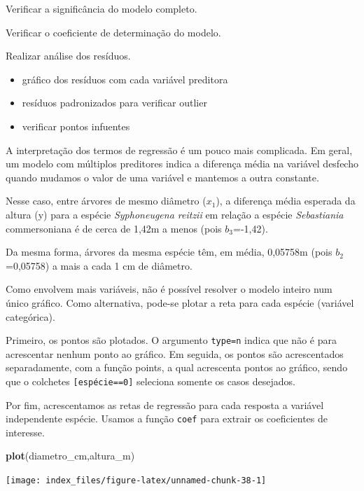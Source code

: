 \documentclass[12pt,brazil,oneside]{book}
\newenvironment{Shaded}{\begin{snugshade}}{\end{snugshade}}
\newcommand{\KeywordTok}[1]{\textcolor[rgb]{0.13,0.29,0.53}{\textbf{#1}}}
\newcommand{\NormalTok}[1]{#1}
\providecommand{\tightlist}{%
  \setlength{\itemsep}{0pt}\setlength{\parskip}{0pt}}
\begin{document}
Verificar a significância do modelo completo.

Verificar o coeficiente de determinação do modelo.

Realizar análise dos resíduos.

\begin{itemize}
\tightlist
\item
  gráfico dos resíduos com cada variável preditora
\item
  resíduos padronizados para verificar outlier
\item
  verificar pontos infuentes
\end{itemize}

A interpretação dos termos de regressão é um pouco mais complicada. Em
geral, um modelo com múltiplos preditores indica a diferença média na
variável desfecho quando mudamos o valor de uma variável e mantemos a
outra constante.

Nesse caso, entre árvores de mesmo diâmetro (\(x_1\)), a diferença média
esperada da altura (y) para a espécie \emph{Syphoneugena reitzii} em
relação a espécie \emph{Sebastiania} commersoniana é de cerca de 1,42m a
menos (pois \(b_3\)=-1,42).

Da mesma forma, árvores da mesma espécie têm, em média, 0,05758m (pois
\(b_2\)=0,05758) a mais a cada 1 cm de diâmetro.

Como envolvem mais variáveis, não é possível resolver o modelo inteiro
num único gráfico. Como alternativa, pode-se plotar a reta para cada
espécie (variável categórica).

Primeiro, os pontos são plotados. O argumento
\texttt{type=\textquotesingle{}n\textquotesingle{}} indica que não é
para acrescentar nenhum ponto ao gráfico. Em seguida, os pontos são
acrescentados separadamente, com a função points, a qual acrescenta
pontos ao gráfico, sendo que o colchetes \texttt{{[}espécie==0{]}}
seleciona somente os casos desejados.

Por fim, acrescentamos as retas de regressão para cada resposta a
variável independente espécie. Usamos a função \texttt{coef} para
extrair os coeficientes de interesse.

\begin{Shaded}
\begin{Highlighting}[]
\KeywordTok{plot}\NormalTok{(diametro_cm,altura_m)}
\end{Highlighting}
\end{Shaded}

\begin{center}\texttt{[image: index\_files/figure-latex/unnamed-chunk-38-1]} \end{center}
\end{document}
